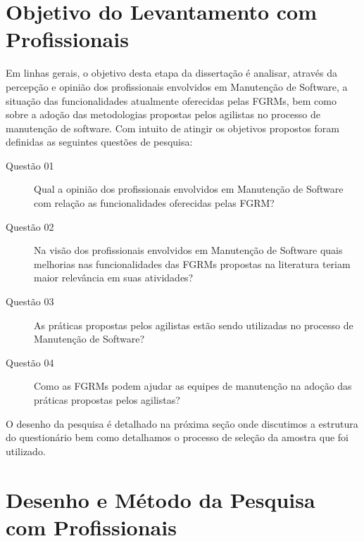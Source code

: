 \section{Objetivo do Levantamento com Profissionais}\label{sec:objetivo_da_pesquisa_com_profissionais}

Em linhas gerais, o objetivo desta etapa da dissertação é analisar, através da
percepção e opinião dos profissionais envolvidos em Manutenção de Software, a
situação das funcionalidades atualmente oferecidas pelas FGRMs, bem como sobre
a adoção das metodologias propostas pelos agilistas no processo de manutenção
de software. Com intuito de atingir os objetivos propostos foram definidas as
seguintes questões de pesquisa:


\begin{description}
	\item[Questão 01] Qual a opinião dos profissionais envolvidos em Manutenção
		de Software com relação as funcionalidades oferecidas pelas
		FGRM\@?
	\item[Questão 02] Na visão dos profissionais envolvidos em Manutenção de
        Software quais melhorias nas funcionalidades das FGRMs propostas na
        literatura teriam maior relevância em suas atividades?
	\item[Questão 03] As práticas propostas pelos agilistas estão sendo
        utilizadas no processo de Manutenção de Software?
    \item[Questão 04] Como as FGRMs podem ajudar as equipes de manutenção na
        adoção das práticas propostas pelos agilistas?
\end{description}

O desenho da pesquisa é detalhado na próxima seção onde discutimos a estrutura
do questionário bem como detalhamos o processo de seleção da amostra que foi
utilizado.

\section{Desenho e Método da Pesquisa com Profissionais}\label{sec:desenho_da_pesquisa_com_profissionais}


